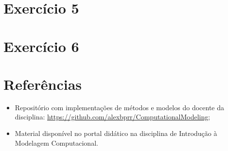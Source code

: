 \documentclass[a4paper, 12pt]{article}
\begin{document}
\section*{Exercício 5}
\section*{Exercício 6}

\pagebreak

\section*{Referências}

\begin{itemize}
    \item Repositório com implementações de métodos e modelos do docente da disciplina: \url{https://github.com/alexbprr/ComputationalModeling};
    \item Material disponível no portal didático na disciplina de Introdução à Modelagem Computacional.
\end{itemize}
\end{document}

